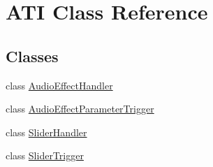 \hypertarget{class_a_t_i}{}\section{A\+TI Class Reference}
\label{class_a_t_i}
\subsection*{Classes}
\begin{DoxyCompactItemize}
\item 
class \hyperlink{class_a_t_i_1_1_audio_effect_handler}{Audio\+Effect\+Handler}
\item 
class \hyperlink{class_a_t_i_1_1_audio_effect_parameter_trigger}{Audio\+Effect\+Parameter\+Trigger}
\item 
class \hyperlink{class_a_t_i_1_1_slider_handler}{Slider\+Handler}
\item 
class \hyperlink{class_a_t_i_1_1_slider_trigger}{Slider\+Trigger}
\end{DoxyCompactItemize}
